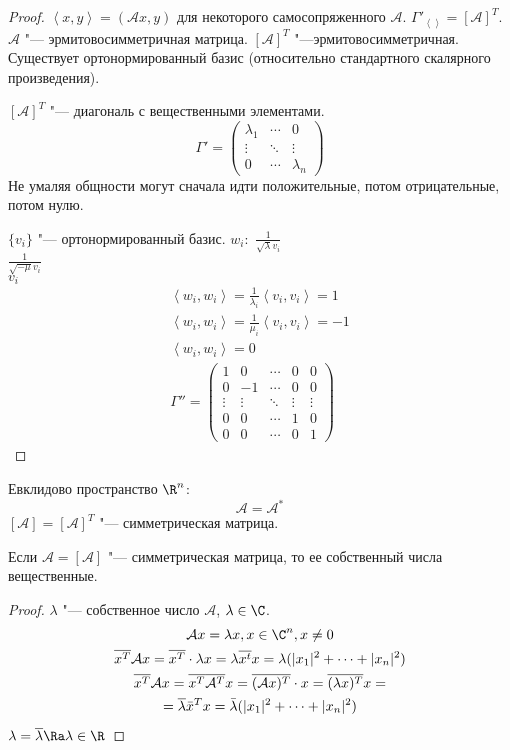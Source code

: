 \begin{proof}
	$\left<x, y\right> = (\mathcal Ax, y)$ для некоторого самосопряженного $\mathcal A$.
	$\Gamma'_{\left<\right>} = [\mathcal A]^T$.
	$\mathcal A$ "--- эрмитовосимметричная матрица.
	$[\mathcal A]^T$ "---эрмитовосимметричная.
	Существует ортонормированный базис (относительно стандартного скалярного произведения).

	$[\mathcal A]^T$ "--- диагональ с вещественными элементами.
	\[
		\Gamma' = \begin{pmatrix}
			\lambda_1 & \cdots & 0 \\
			\vdots & \ddots & \vdots \\
			0 & \cdots & \lambda_n
		\end{pmatrix}
	\]
	Не умаляя общности могут сначала идти положительные, потом отрицательные, потом нулю.

	$\{v_i\}$ "--- ортонормированный базис.
	$w_i:$
	$\frac{1}{\sqrt{\lambda}v_i}$\\
	$\frac{1}{\sqrt{-\mu}v_i}$\\
	$v_i$ \TODO
	\begin{gather*}
		\left<w_i, w_i\right> = \frac1{\lambda_i} \left<v_i, v_i\right> = 1 \\
		\left<w_i, w_i\right> = \frac1{\mu_i} \left<v_i, v_i\right> = -1 \\
		\left<w_i, w_i\right> = 0 \\
		\Gamma'' = \begin{pmatrix}
			1 & 0 &\cdots & 0 & 0 \\
			0 &-1 &\cdots & 0 & 0 \\
			\vdots&\vdots &\ddots&\vdots&\vdots\\
			0 & 0 &\cdots & 1 & 0 \\
			0 & 0 &\cdots & 0 & 1
		\end{pmatrix}
	\end{gather*}
\end{proof}

Евклидово пространство $\R^n$:
\[ \mathcal A = \mathcal{A}^* \]
$[\mathcal A] = [\mathcal A]^T$  "--- симметрическая матрица.

\begin{lemma}
	Если $\mathcal A = [\mathcal A]$ "--- симметрическая матрица, то ее собственный числа вещественные.
\end{lemma}

\begin{proof}
	$\lambda$ "--- собственное число $\mathcal A$, $\lambda \in \C$.
	\begin{gather*}
		\mathcal Ax = \lambda x, x \in \C^n, x \ne 0 \\
		\overline{x^T} \mathcal Ax
		= \overline{x^T} \cdot \lambda x
		= \lambda \overline{x^t}x
		= \lambda(|x_1|^2 + \cdots + |x_n|^2) \\
		\overline{x^T} \mathcal Ax
		= \overline{x^T} \overline{\mathcal{A}^T}x
		= \overline{(\mathcal Ax)^T} \cdot x
		= \overline{(\lambda x)^T} x = \\
		= \overline{\lambda}\bar x^Tx = \bar \lambda(|x_1|^2 + \cdots + |x_n|^2)
	\end{gather*}
	$\lambda = \overline{\lambda} \Ra \lambda \in \R$
\end{proof}

